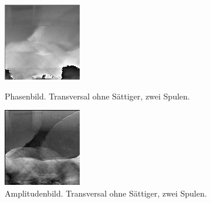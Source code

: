 \documentclass[
    11pt,
    ngerman
]{scrreprt}
\begin{document}
\begin{figure}[htbp]
    \begin{minipage}[htbp]{.45\textwidth}
        \centering
        \includegraphics[width=.9\textwidth]{Abbildungen/2015-03-13_3_1.png}
        \caption{Phasenbild. Transversal ohne Sättiger, zwei Spulen.}
        \label{fig:2015-03-13_3_1}
    \end{minipage}
    \hfill
    \begin{minipage}[htbp]{.45\textwidth}
        \centering
        \includegraphics[width=.9\textwidth]{Abbildungen/2015-03-13_2_1.png}
        \caption{Amplitudenbild. Transversal ohne Sättiger, zwei Spulen.}
        \label{fig:2015-03-13_2_1}
    \end{minipage}
\end{figure}
\end{document}
